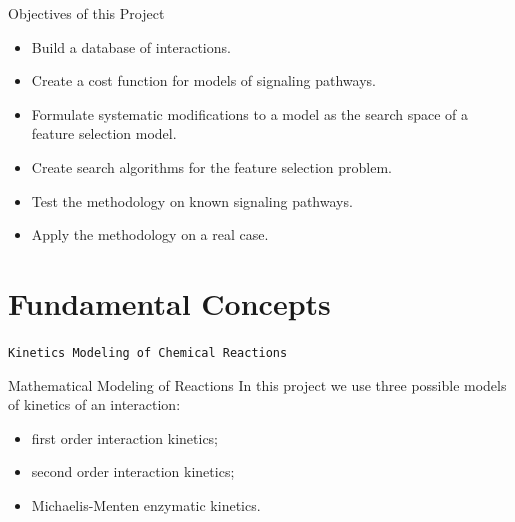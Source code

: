 \documentclass{beamer}
\begin{document}
\begin{frame}{Objectives of this Project}
\begin{itemize}
\pause
\item{Build a database of interactions.}
\pause
\item{Create a cost function for models of signaling pathways.}
\pause
\item{Formulate systematic modifications to a model as the search space
    of a feature selection model.}
\pause
\item{Create search algorithms for the feature selection problem.}
\pause
\item{Test the methodology on known signaling pathways.}
\pause
\item{Apply the methodology on a real case.}
\end{itemize}
\end{frame}


\section{Fundamental Concepts}



\begin{frame}{}
\begin{center}
\texttt{Kinetics Modeling of Chemical Reactions}
\end{center}
\end{frame}

\begin{frame}{Mathematical Modeling of Reactions}
In this project we use three possible models of kinetics of an 
interaction:
\begin{itemize}
\pause
\item{first order interaction kinetics;}
\pause
\item{second order interaction kinetics;}
\pause
\item{Michaelis-Menten enzymatic kinetics.}
\end{itemize}
\end{frame}
\end{document}
